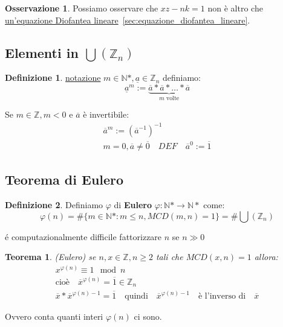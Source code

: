 \documentclass{article}
\newtheorem{theorem}{Teorema}[section]
\theoremstyle{definition}
\newtheorem{definition}{Definizione}[section]
\newtheorem{oss}{Osservazione}[section]
\begin{document}
\begin{oss}
       Possiamo osservare che $xz - nk = 1$ non è altro che \underline{un'equazione Diofantea lineare}~\ref{sec:equazione_diofantea_lineare}.
\end{oss}


\subsection{Elementi in $ \bigcup(\mathbb{Z}_n) $}
\begin{definition}
        \underline{notazione} $m \in \mathbb{N}*, \underline{a} \in \mathbb{Z}_n$ definiamo:
        \begin{equation*}
                \underline{a}^m := \underbrace{\overline{a} * \overline{a} * \ldots * \overline{a}}_{\mbox{$m$ volte}}
        \end{equation*}

        Se $m \in \mathbb{Z}, m < 0$ e $\overline{a}$ è invertibile:
        \begin{align*}
                \overline{a}^m := {(\overline{a}^{-1})}^{-1} \\
                m = 0, \overline{a} \not = \overline{0} \quad DEF \quad \overline{a}^0 := \overline{1}
        \end{align*}
\end{definition}



\subsection{Teorema di Eulero}\label{sec:teorema_di_eulero}
\begin{definition}
        Definiamo $\varphi$ di \textbf{Eulero} $\varphi : \mathbb{N}* \to \mathbb{N}*$ come:
        \begin{equation*}
                \varphi(n) = \# \{m \in \mathbb{N}* : m \le n, MCD(m,n)=1\} = \#\bigcup(\mathbb{Z}_n)
        \end{equation*}
\end{definition}

é computazionalmente difficile fattorizzare $n$ se $n \gg 0$


\begin{theorem}
        (Eulero) se $n,x \in \mathbb{Z}, n \ge 2$ tali che $ MCD(x,n) = 1 $ allora:
        \begin{align*}
                x^{\varphi(n)} \equiv 1 \mod n \\
                \mbox{cioè} \quad \overline{x}^{\varphi(n)} = \overline{1} \in \mathbb{Z}_n \\
                \overline{x} * \overline{x}^{\varphi(n)-1} = \overline{1} \quad \mbox{quindi} \quad \overline{x}^{\varphi(n)-1} \quad \mbox{è l'inverso di} \quad \overline{x}
        \end{align*}
\end{theorem}
Ovvero conta quanti interi $\varphi(n)$ ci sono.
\end{document}
